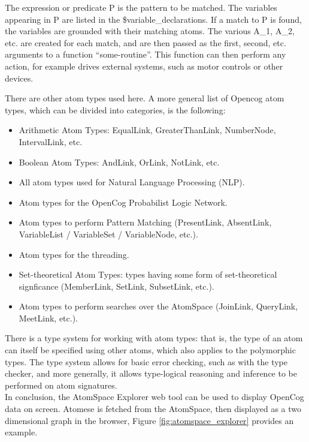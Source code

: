 \begin{itemize}
The expression or predicate P is the pattern to be matched. The variables appearing in P are listed in the \$variable\_declarations. If a match to P is found, the variables are grounded with their matching atoms. The various A\_1, A\_2, etc. are created for each match, and are then passed as the first, second, etc. arguments to a function \enquote{some-routine}. This function can then perform any action, for example drives external systems, such as motor controls or other devices.
\end{itemize}

There are other atom types used here. A more general list of Opencog atom types, which can be divided into categories, is the following:

\begin{itemize}
\item Arithmetic Atom Types: EqualLink, GreaterThanLink, NumberNode, IntervalLink, etc.
\item Boolean Atom Types: AndLink, OrLink, NotLink, etc. 
\item All atom types used for Natural Language Processing (NLP).
\item Atom types for the OpenCog Probabilist Logic Network.
\item Atom types to perform Pattern Matching (PresentLink, AbsentLink, VariableList / VariableSet / VariableNode, etc.).
\item Atom types for the threading.
\item Set-theoretical Atom Types: types having some form of set-theoretical signficance (MemberLink, SetLink, SubsetLink, etc.).
\item Atom types to perform searches over the AtomSpace (JoinLink, QueryLink, MeetLink, etc.).
\end{itemize}

There is a type system for working with atom types: that is, the type of an atom can itself be specified using other atoms, which also applies to the polymorphic types. The type system allows for basic error checking, such as with the type checker, and more generally, it allows type-logical reasoning and inference to be performed on atom signatures. \\

In conclusion, the AtomSpace Explorer web tool can be used to display OpenCog data on screen. Atomese is fetched from the AtomSpace, then displayed as a two dimensional graph in the browser, Figure \ref{fig:atomspace_explorer} provides an example. \\

